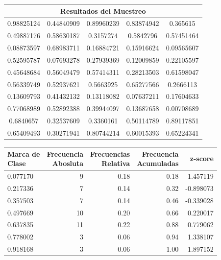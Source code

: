 \documentclass[12pt,a4paper]{article}
\begin{document}
{{            \begin{center}
                \begin{tabular}{ccccc}
                        \multicolumn{5}{c}{Resultados del Muestreo} \\ 
                    \midrule
                        0.98825124 & 0.44840909 & 0.89960239 & 0.83874942 & 0.365615   \\
                        0.49887176 & 0.58630187 & 0.3157274  & 0.5842796  & 0.57451464 \\
                        0.08873597 & 0.68983711 & 0.16884721 & 0.15916624 & 0.09565607 \\
                        0.52595787 & 0.07693278 & 0.27939369 & 0.12009859 & 0.22105597 \\
                        0.45648684 & 0.56049479 & 0.57414311 & 0.28213503 & 0.61598047 \\
                        0.56339749 & 0.52937621 & 0.5663925  & 0.65277566 & 0.2666113  \\
                        0.13609793 & 0.41432132 & 0.13118082 & 0.07637211 & 0.17604633 \\
                        0.77068989 & 0.52892388 & 0.39944097 & 0.13687658 & 0.00708689 \\
                        0.6840657  & 0.32537609 & 0.3360161  & 0.50114789 & 0.89117851 \\
                        0.65409493 & 0.30271941 & 0.80744214 & 0.60015393 & 0.65224341 \\
                \end{tabular}
            \end{center}

            \begin{center}
                \begin{tabular}{lrrrr}
                \toprule
                    \makecell{Marca de\\Clase} & \makecell{Frecuencia\\Abosluta} & \makecell{Frecuencias\\Relativa} & \makecell{Frecuencia\\Acumuladas} & z-score \\
                \midrule
                    0.077170 &  9 & 0.18 & 0.18 & -1.457119 \\
                    0.217336 &  7 & 0.14 & 0.32 & -0.898073 \\
                    0.357503 &  7 & 0.14 & 0.46 & -0.339028 \\
                    0.497669 & 10 & 0.20 & 0.66 & 0.220017 \\
                    0.637835 & 11 & 0.22 & 0.88 & 0.779062 \\
                    0.778002 &  3 & 0.06 & 0.94 & 1.338107 \\
                    0.918168 &  3 & 0.06 & 1.00 & 1.897152 \\
                \bottomrule
                \end{tabular}
            \end{center}

}}
\end{document}
